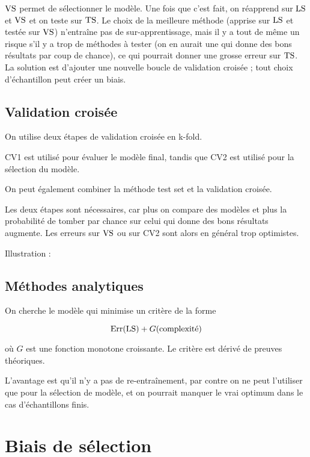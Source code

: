 	$\text{VS}$ permet de sélectionner le modèle. Une fois que c'est fait, on réapprend sur $\text{LS}$ et $\text{VS}$ et on teste sur $\text{TS}$. Le choix de la meilleure méthode (apprise sur $\text{LS}$ et testée sur $\text{VS}$) n'entraîne pas de sur-apprentissage, mais il y a tout de même un risque s'il y a trop de méthodes à tester (on en aurait une qui donne des bons résultats par coup de chance), ce qui pourrait donner une grosse erreur sur $\text{TS}$. La solution est d'ajouter une nouvelle boucle de validation croisée ; tout choix d'échantillon peut créer un biais.
	
	\subsection{Validation croisée}
	
	On utilise deux étapes de validation croisée en k-fold.
	
	
	CV1 est utilisé pour évaluer le modèle final, tandis que CV2 est utilisé pour la sélection du modèle.
	
	On peut également combiner la méthode test set et la validation croisée.
	
	
	Les deux étapes sont nécessaires, car plus on compare des modèles et plus la probabilité de tomber par chance sur celui qui donne des bons résultats augmente. Les erreurs sur $\text{VS}$ ou sur CV2 sont alors en général trop optimistes.
	
	Illustration :
	
	
	\subsection{Méthodes analytiques}
	
	On cherche le modèle qui minimise un critère de la forme
	
	$$\text{Err}(\text{LS}) + G(\text{complexité})$$
	
	où $G$ est une fonction monotone croissante. Le critère est dérivé de preuves théoriques.
	
	L'avantage est qu'il n'y a pas de re-entraînement, par contre on ne peut l'utiliser que pour la sélection de modèle, et on pourrait manquer le vrai optimum dans le cas d'échantillons finis.
	
\section{Biais de sélection}
	
